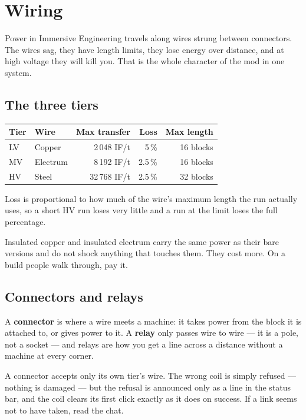 \chapter{Wiring}
\label{ch:wiring}

Power in Immersive Engineering travels along wires strung between connectors. The wires sag, they
have length limits, they lose energy over distance, and at high voltage they will kill you. That is
the whole character of the mod in one system.

\section{The three tiers}

\begin{center}
\small
\begin{tabular}{@{}llrrr@{}}
\toprule
Tier & Wire & Max transfer & Loss & Max length \\
\midrule
LV & Copper    & 2\,048 IF/t  & 5\,\%   & 16 blocks \\
MV & Electrum  & 8\,192 IF/t  & 2.5\,\% & 16 blocks \\
HV & Steel     & 32\,768 IF/t & 2.5\,\% & 32 blocks \\
\bottomrule
\end{tabular}
\end{center}

Loss is proportional to how much of the wire's maximum length the run actually uses, so a short HV
run loses very little and a run at the limit loses the full percentage.

\begin{ietip}
Insulated copper and insulated electrum carry the same power as their bare versions and do not shock
anything that touches them. They cost more. On a build people walk through, pay it.
\end{ietip}

\section{Connectors and relays}

A \textbf{connector} is where a wire meets a machine: it takes power from the block it is attached
to, or gives power to it. A \textbf{relay} only passes wire to wire --- it is a pole, not a socket
--- and relays are how you get a line across a distance without a machine at every corner.

\begin{ietip}
A connector accepts only its own tier's wire. The wrong coil is simply refused --- nothing is
damaged --- but the refusal is announced only as a line in the status bar, and the coil clears its
first click exactly as it does on success. If a link seems not to have taken, read the chat.
\end{ietip}

